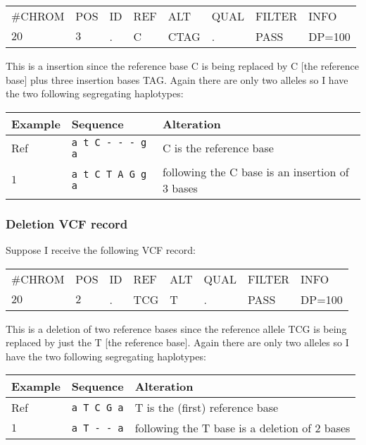 \documentclass[8pt]{article}
\begin{document}
\vspace{0.3cm}
\begin{tabular}{ l l l l l l l l}
	\#CHROM & POS & ID & REF & ALT & QUAL & FILTER & INFO \\
	$20$ & $3$ & . & C & CTAG & . & PASS & DP=100 \\
\end{tabular}
\vspace{0.3cm}

This is a insertion since the reference base C is being replaced by C [the reference base] plus three insertion bases TAG. Again there are only two alleles so I have the two following segregating haplotypes:

\vspace{0.3cm}
\begin{tabular}{ | l | l | l | }
\hline
Example & Sequence & Alteration \\ \hline
Ref & \verb|a t C - - - g a| & C is the reference base \\ \hline
$1$ & \verb|a t C T A G g a| & following the C base is an insertion of 3 bases \\ \hline
\end{tabular}

\subsubsection{Deletion VCF record}
Suppose I receive the following VCF record:

\vspace{0.3cm}
\begin{tabular}{ l l l l l l l l}
	\#CHROM & POS & ID & REF & ALT & QUAL & FILTER & INFO \\
	$20$ & $2$ & . & TCG & T & . & PASS & DP=100 \\
\end{tabular}
\vspace{0.3cm}

This is a deletion of two reference bases since the reference allele TCG is being replaced by just the T [the reference base]. Again there are only two alleles so I have the two following segregating haplotypes:

\vspace{0.3cm}
\begin{tabular}{ | l | l | l | }
\hline
Example & Sequence & Alteration \\ \hline
Ref & \verb|a T C G a| & T is the (first) reference base \\ \hline
$1$ & \verb|a T - - a| & following the T base is a deletion of 2 bases \\ \hline
\end{tabular}
\end{document}
